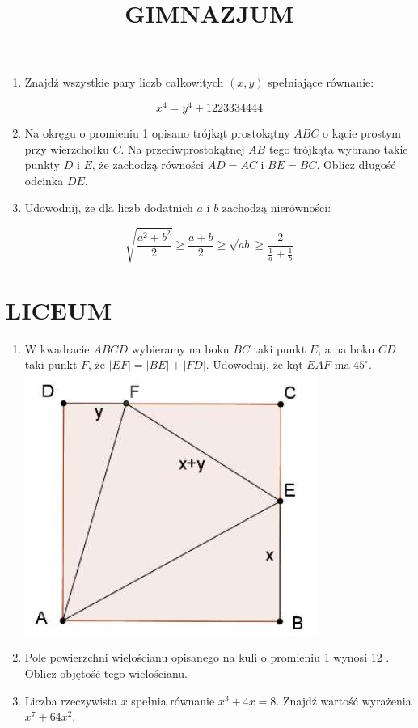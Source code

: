\documentclass[10pt]{article}
\title{GIMNAZJUM }
\author{}
\date{}
\begin{document}
\maketitle
\begin{enumerate}
  \item Znajdź wszystkie pary liczb całkowitych \((x, y)\) spełniające równanie:
\end{enumerate}

\[
x^{4}=y^{4}+1223334444
\]

\begin{enumerate}
  \setcounter{enumi}{1}
  \item Na okręgu o promieniu 1 opisano trójkąt prostokątny \(A B C\) o kącie prostym przy wierzchołku \(C\). Na przeciwprostokątnej \(A B\) tego trójkąta wybrano takie punkty \(D\) i \(E\), że zachodzą równości \(A D=A C\) i \(B E=B C\). Oblicz długość odcinka \(D E\).
  \item Udowodnij, że dla liczb dodatnich \(a\) i \(b\) zachodzą nierówności:
\end{enumerate}

\[
\sqrt{\frac{a^{2}+b^{2}}{2}} \geq \frac{a+b}{2} \geq \sqrt{a b} \geq \frac{2}{\frac{1}{a}+\frac{1}{b}}
\]

\section*{LICEUM}
\begin{enumerate}
  \item W kwadracie \(A B C D\) wybieramy na boku \(B C\) taki punkt \(E\), a na boku \(C D\) taki punkt \(F\), że \(|E F|=|B E|+|F D|\). Udowodnij, że kąt \(E A F\) ma \(45^{\circ}\).\\
\includegraphics[max width=\textwidth, center]{2024_11_21_76d6cd89e909e377064fg-1}
  \item Pole powierzchni wielościanu opisanego na kuli o promieniu 1 wynosi 12 . Oblicz objętość tego wielościanu.
  \item Liczba rzeczywista \(x\) spełnia równanie \(x^{3}+4 x=8\). Znajdź wartość wyrażenia \(x^{7}+64 x^{2}\).
\end{enumerate}
\end{document}
